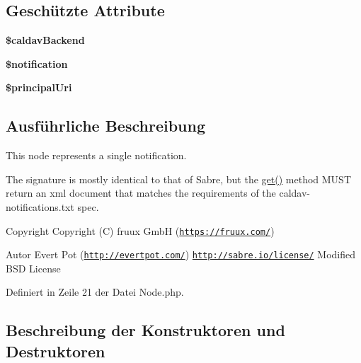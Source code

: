 \subsection*{Geschützte Attribute}
\begin{DoxyCompactItemize}
\item 
\mbox{\label{class_sabre_1_1_cal_d_a_v_1_1_notifications_1_1_node_a34f8987a9931c10d80ff2d83e8bec6c2}} 
{\bfseries \$caldav\+Backend}
\item 
\mbox{\label{class_sabre_1_1_cal_d_a_v_1_1_notifications_1_1_node_abc83f9c54660c44d5dc7d4381b542ccb}} 
{\bfseries \$notification}
\item 
\mbox{\label{class_sabre_1_1_cal_d_a_v_1_1_notifications_1_1_node_a4a2511a6364361c61ed00424acfde123}} 
{\bfseries \$principal\+Uri}
\end{DoxyCompactItemize}


\subsection{Ausführliche Beschreibung}
This node represents a single notification.

The signature is mostly identical to that of Sabre, but the \mbox{\hyperlink{class_sabre_1_1_d_a_v_1_1_file_a0879cd6cff2723f41eb31dae59bc63d0}{get()}} method M\+U\+ST return an xml document that matches the requirements of the \textquotesingle{}caldav-\/notifications.\+txt\textquotesingle{} spec.

\begin{DoxyCopyright}{Copyright}
Copyright (C) fruux GmbH (\href{https://fruux.com/}{\tt https\+://fruux.\+com/}) 
\end{DoxyCopyright}
\begin{DoxyAuthor}{Autor}
Evert Pot (\href{http://evertpot.com/}{\tt http\+://evertpot.\+com/})  \href{http://sabre.io/license/}{\tt http\+://sabre.\+io/license/} Modified B\+SD License 
\end{DoxyAuthor}


Definiert in Zeile 21 der Datei Node.\+php.



\subsection{Beschreibung der Konstruktoren und Destruktoren}
\mbox{\label{class_sabre_1_1_cal_d_a_v_1_1_notifications_1_1_node_a11dae863ce3661482b34d7307662e8f3}} 
